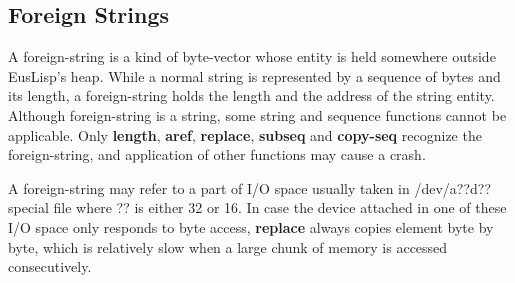 \begin{refdesc}








\end{refdesc}

\subsection{Foreign Strings}
A foreign-string is a kind of byte-vector whose entity is held somewhere
outside EusLisp's heap.
While a normal string is represented by a sequence of bytes and its length,
a foreign-string holds the length and the address of the string entity.
Although foreign-string is a string,
some string and  sequence functions cannot be applicable.
Only {\bf length}, {\bf aref}, {\bf replace}, {\bf subseq} and {\bf copy-seq}
recognize the foreign-string, 
and application of other functions may cause a crash.

A foreign-string may refer to a part of I/O space usually
taken in /dev/a??d?? special file where ?? is either 32 or 16.
In case the device attached in one of these I/O space only responds
to byte access, {\bf replace} always copies element byte by byte,
which is relatively slow when a large chunk of memory is accessed
consecutively.

\begin{refdesc}


\end{refdesc}
\newpage

